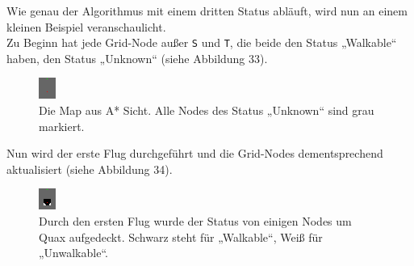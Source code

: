 \documentclass[a4paper,12pt]{article}
\newcommand{\code}{\texttt}
\begin{document}
Wie genau der Algorithmus mit einem dritten Status abläuft, wird nun an einem kleinen Beispiel veranschaulicht.
\\[0.4cm]
Zu Beginn hat jede Grid-Node außer \code{S} und \code{T}, die beide den Status „Walkable“ haben, den Status „Unknown“ (siehe Abbildung 33). 
\begin{figure}[H]
\centering
    \includegraphics[width=.5\linewidth]{Bilder/Aufgabe3/Beispiel_01.png}
    \caption{Die Map aus A* Sicht. Alle Nodes des Status „Unknown“ sind grau markiert.}
\end{figure}
Nun wird der erste Flug durchgeführt und die Grid-Nodes dementsprechend aktualisiert (siehe Abbildung 34).
\begin{figure}[H]
\centering
    \includegraphics[width=.5\linewidth]{Bilder/Aufgabe3/Beispiel_02.png}
    \caption{Durch den ersten Flug wurde der Status von einigen Nodes um Quax aufgedeckt. Schwarz steht für „Walkable“, Weiß für „Unwalkable“.}
\end{figure}
\end{document}
